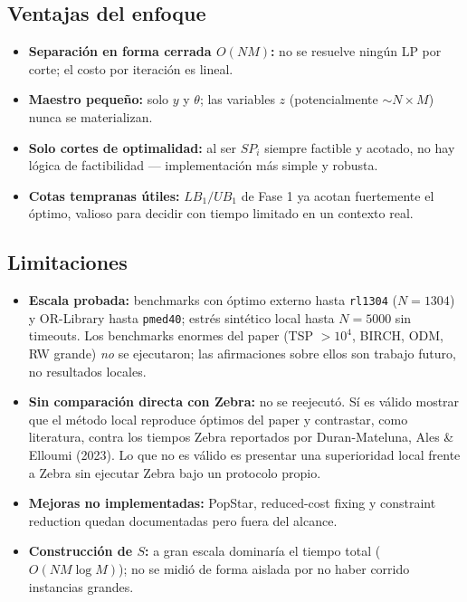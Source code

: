 \subsection{Ventajas del enfoque}
\begin{itemize}[noitemsep]
  \item \textbf{Separación en forma cerrada $O(NM)$:} no se resuelve ningún LP por corte; el costo
        por iteración es lineal.
  \item \textbf{Maestro pequeño:} solo $y$ y $\theta$; las variables $z$ (potencialmente
        $\sim N\times M$) nunca se materializan.
  \item \textbf{Solo cortes de optimalidad:} al ser $SP_i$ siempre factible y acotado, no hay
        lógica de factibilidad — implementación más simple y robusta.
  \item \textbf{Cotas tempranas útiles:} $LB_1/UB_1$ de Fase 1 ya acotan fuertemente el óptimo,
        valioso para decidir con tiempo limitado en un contexto real.
\end{itemize}

\subsection{Limitaciones}
\begin{itemize}[noitemsep]
  \item \textbf{Escala probada:} benchmarks con óptimo externo hasta \texttt{rl1304} ($N=1304$) y
        OR-Library hasta \texttt{pmed40}; estrés sintético local hasta $N=5000$ sin timeouts. Los
        benchmarks enormes del paper (TSP $>10^4$, BIRCH, ODM, RW grande) \emph{no} se ejecutaron;
        las afirmaciones sobre ellos son trabajo futuro, no resultados locales.
  \item \textbf{Sin comparación directa con Zebra:} no se reejecutó. Sí es válido mostrar que el
        método local reproduce óptimos del paper y contrastar, como literatura, contra los tiempos
        Zebra reportados por Duran-Mateluna, Ales \& Elloumi (2023). Lo que no es válido es
        presentar una superioridad local frente a Zebra sin ejecutar Zebra bajo un protocolo propio.
  \item \textbf{Mejoras no implementadas:} PopStar, reduced-cost fixing y constraint reduction
        quedan documentadas pero fuera del alcance.
  \item \textbf{Construcción de $S$:} a gran escala dominaría el tiempo total ($O(NM\log M)$); no
        se midió de forma aislada por no haber corrido instancias grandes.
\end{itemize}

